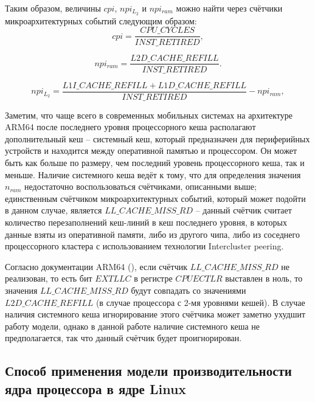     Таким образом, величины $cpi$, $npi_{L_2}$ и $npi_{ram}$ можно найти через счётчики микроархитектурных
    событий следующим образом:
    \begin{equation}
        cpi = \frac{CPU\_CYCLES}{INST\_RETIRED},
    \end{equation}

    \begin{equation}
        npi_{ram} = \frac{L2D\_CACHE\_REFILL}{INST\_RETIRED}.
    \end{equation}

    \begin{equation}
        npi_{L_2} = \frac{L1I\_CACHE\_REFILL + L1D\_CACHE\_REFILL}{INST\_RETIRED} - npi_{ram},
    \end{equation}

    Заметим, что чаще всего в современных мобильных системах на архитектуре ARM64 после последнего
    уровня процессорного кеша располагают дополнительный кеш -- системный кеш,
    который предназначен для периферийных устройств и находится между оперативной памятью и процессором.
    Он может быть как больше по размеру, чем последний уровень процессорного кеша, так и меньше.
    Наличие системного кеша ведёт к тому, что для определения значения $n_{ram}$ недостаточно
    воспользоваться счётчиками, описанными выше; единственным счётчиком микроархитектурных событий,
    который может подойти в данном случае, является $LL\_CACHE\_MISS\_RD$ -- данный счётчик считает
    количество перезаполнений кеш-линий в кеш последнего уровня, в которых данные взяты из оперативной памяти,
    либо из другого чипа, либо из соседнего процессорного кластера с использованием технологии Intercluster peering.

    Согласно документации ARM64 (\cite{ArmPerfAnalyses}), если счётчик $LL\_CACHE\_MISS\_RD$ не реализован,
    то есть бит $EXTLLC$ в регистре $CPUECTLR$ выставлен в ноль, то значения $LL\_CACHE\_MISS\_RD$
    будут совпадать со значениями $L2D\_CACHE\_REFILL$ (в случае процессора с 2-мя уровнями кешей).
    В случае наличия системного кеша игнорирование этого счётчика может заметно ухудшит
    работу модели, однако в данной работе наличие системного кеша не предполагается, так что данный
    счётчик будет проигнорирован.

\subsection{Способ применения модели производительности ядра процессора в ядре Linux}

